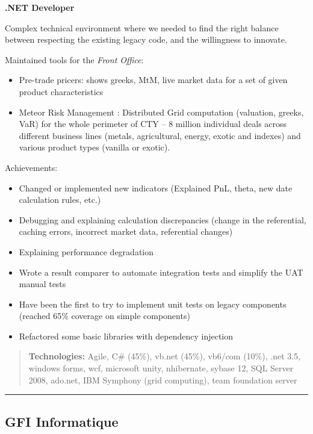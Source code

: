 \documentclass[
]{article}
\providecommand{\tightlist}{%
  \setlength{\itemsep}{0pt}\setlength{\parskip}{0pt}}
\begin{document}
\textbf{.NET Developer}

Complex technical environment where we needed to find the right balance
between respecting the existing legacy code, and the willingness to
innovate.

Maintained tools for the \emph{Front Office}:

\begin{itemize}
\tightlist
\item
  Pre-trade pricers: shows greeks, MtM, live market data for a set of
  given product characteristics
\item
  Meteor Risk Management : Distributed Grid computation (valuation,
  greeks, VaR) for the whole perimeter of CTY -- 8 million individual
  deals across different business lines (metals, agricultural, energy,
  exotic and indexes) and various product types (vanilla or exotic).
\end{itemize}

Achievements:

\begin{itemize}
\tightlist
\item
  Changed or implemented new indicators (Explained PnL, theta, new date
  calculation rules, etc.)
\item
  Debugging and explaining calculation discrepancies (change in the
  referential, caching errors, incorrect market data, referential
  changes)
\item
  Explaining performance degradation
\item
  Wrote a result comparer to automate integration tests and simplify the
  UAT manual tests
\item
  Have been the first to try to implement unit tests on legacy
  components (reached 65\% coverage on simple components)
\item
  Refactored some basic libraries with dependency injection
\end{itemize}

\begin{quote}
\textbf{Technologies:} Agile, C\# (45\%), vb.net (45\%), vb6/com (10\%),
.net 3.5, windows forms, wcf, microsoft unity, nhibernate, sybase 12,
SQL Server 2008, ado.net, IBM Symphony (grid computing), team foundation
server
\end{quote}

\begin{center}\rule{0.5\linewidth}{\linethickness}\end{center}

\hypertarget{gfi-informatique-032010---062011-1yr}{%
\subsection{\texorpdfstring{GFI Informatique \hfill{}}{GFI Informatique 03/2010 - 06/2011 (\textasciitilde1yr)}}\label{gfi-informatique-032010---062011-1yr}}
\end{document}
